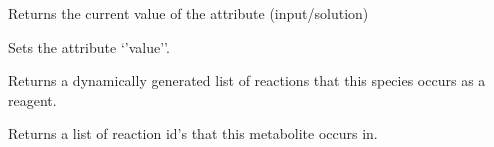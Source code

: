 \documentclass[letterpaper,12pt,english]{sphinxmanual}
\begin{document}
\begin{fulllineitems}

\begin{fulllineitems}
\label{\detokenize{api/core:cbmpy.CBModel.Species.getValue}}
\pysigstartsignatures
\pysiglinewithargsret
{}
{}
{}
\pysigstopsignatures
\sphinxAtStartPar
Returns the current value of the attribute (input/solution)

\end{fulllineitems}


\begin{fulllineitems}
\label{\detokenize{api/core:cbmpy.CBModel.Species.setValue}}
\pysigstartsignatures
\pysiglinewithargsret
{}
{}
{}
\pysigstopsignatures
\sphinxAtStartPar
Sets the attribute ‘’value’’.

\end{fulllineitems}


\begin{fulllineitems}
\label{\detokenize{api/core:cbmpy.CBModel.Species.isReagentOf}}
\pysigstartsignatures
\pysiglinewithargsret
{}
{}
{}
\pysigstopsignatures
\sphinxAtStartPar
Returns a dynamically generated list of reactions that this species occurs as
a reagent.

\end{fulllineitems}


\begin{fulllineitems}
\label{\detokenize{api/core:cbmpy.CBModel.Species.getReagentOf}}
\pysigstartsignatures
\pysiglinewithargsret
{}
{}
{}
\pysigstopsignatures
\sphinxAtStartPar
Returns a list of reaction id’s that this metabolite occurs in.

\end{fulllineitems}



\end{fulllineitems}
\end{document}
